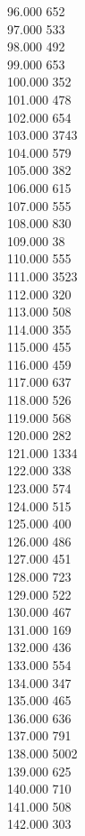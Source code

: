 { 96.000	652 \\
 97.000	533 \\
 98.000	492 \\
 99.000	653 \\
 100.000	352 \\
 101.000	478 \\
 102.000	654 \\
 103.000	3743 \\
 104.000	579 \\
 105.000	382 \\
 106.000	615 \\
 107.000	555 \\
 108.000	830 \\
 109.000	38 \\
 110.000	555 \\
 111.000	3523 \\
 112.000	320 \\
 113.000	508 \\
 114.000	355 \\
 115.000	455 \\
 116.000	459 \\
 117.000	637 \\
 118.000	526 \\
 119.000	568 \\
 120.000	282 \\
 121.000	1334 \\
 122.000	338 \\
 123.000	574 \\
 124.000	515 \\
 125.000	400 \\
 126.000	486 \\
 127.000	451 \\
 128.000	723 \\
 129.000	522 \\
 130.000	467 \\
 131.000	169 \\
 132.000	436 \\
 133.000	554 \\
 134.000	347 \\
 135.000	465 \\
 136.000	636 \\
 137.000	791 \\
 138.000	5002 \\
 139.000	625 \\
 140.000	710 \\
 141.000	508 \\
 142.000	303 \\
}
